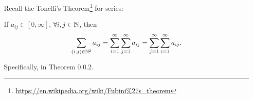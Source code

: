 \begin{note}\label{Thm:Tonell's}
	Recall the Tonelli's Theorem\footnote{\url{https://en.wikipedia.org/wiki/Fubini\%27s_theorem}} for series:
	\par If \(a_{ij}\in [0, \infty ]\), \(\forall i, j\in \mathbb{\MakeUppercase{N}} \), then
	\[
		\sum\limits_{(i, j)\in\mathbb{\MakeUppercase{N}} ^2}a_{ij} = \sum\limits_{i=1}^{\infty} \sum\limits_{j=1}^{\infty} a_{ij} = \sum\limits_{j=1}^{\infty} \sum\limits_{i=1}^{\infty} a_{ij}.
	\]

	Specifically, in \cite{tao2013introduction} Theorem 0.0.2.
\end{note}
